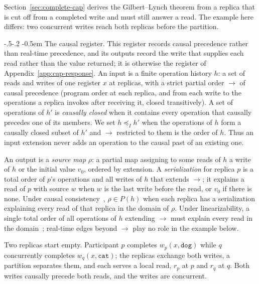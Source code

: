 \documentclass[sigconf]{cidr-2027}
\makeatletter
\theoremstyle{remark}
\renewcommand\paragraph{\@startsection{paragraph}{4}{\z@}%
  {-.5\baselineskip \@plus -2\p@ \@minus -.2\p@}%
  {-0.5em}%
  {\normalfont\bfseries}}
\newcommand{\InputOrd}{\preceq_I}
\newcommand{\indesc}{input extension\xspace} %
\newcommand{\fiber}[1]{P(#1)}
\newcommand{\dog}{\texttt{dog}}
\newcommand{\catv}{\texttt{cat}}
\makeatother
\begin{document}
\color{blue!70!black}Section~\ref{sec:complete-cap} derives the Gilbert--Lynch theorem from a
replica that is cut off from a completed write and must still answer a read.
The example here differs: two concurrent writes reach both replicas before the
partition.\color{black}

\paragraph{The causal register.}
This register records causal precedence rather than real-time precedence, and
its outputs record the write that supplies each read rather than the value
returned; it is otherwise the register of Appendix~\ref{app:cap-response}.  An
input is a finite operation history $h$: a set of reads and writes of one
register $x$ at replicas, with a strict partial order $\to$ of causal
precedence (program order at each replica, and from each write to the
operations a replica invokes after receiving it, closed transitively).  A set
of operations of $h'$ is \emph{causally closed} when it contains every
operation that causally precedes one of its members.  We set $h\InputOrd h'$
when the operations of $h$ form a causally closed subset of $h'$ and $\to$
restricted to them is the order of $h$.  Thus an \indesc never adds an
operation to the causal past of an existing one.

An output is a \emph{source map} $\rho$: a partial map assigning to some reads
of $h$ a write of $h$ or the initial value $v_0$, ordered by extension.  A
\emph{serialization} for replica $p$ is a total order of $p$'s operations and
all writes of $h$ that extends $\to$; it explains a read of $p$ with source
$w$ when $w$ is the last write before the read, or $v_0$ if there is none.
Under causal consistency~\cite{lamport1978time,ahamad1995causal},
$\rho\in\fiber{h}$ when each replica has a serialization explaining every read
of that replica in the domain of $\rho$.  Under linearizability, a single
total order of all operations of $h$ extending $\to$ must explain every read
in the domain~\cite{herlihy1990linearizability}; real-time edges beyond $\to$
play no role in the example below.

Two replicas start empty.  Participant $p$ completes $w_p(x,\dog)$ while $q$
concurrently completes $w_q(x,\catv)$; the replicas exchange both writes, a
partition separates them, and each serves a local read, $r_p$ at $p$ and $r_q$
at $q$.  Both writes causally precede both reads, and the writes are
concurrent.
\end{document}
